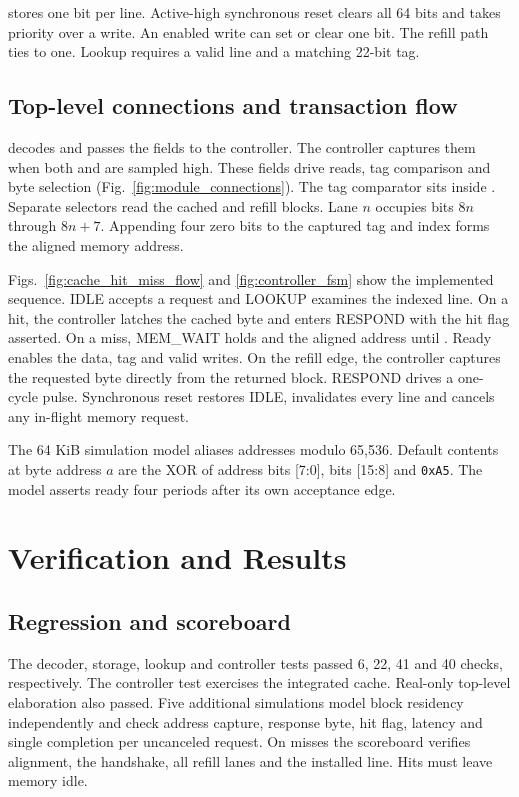 \documentclass[conference]{IEEEtran}
\begin{document}
 stores one bit per line. Active-high synchronous reset clears all 64 bits and takes priority over a write. An enabled write can set or clear one bit. The refill path ties  to one. Lookup requires a valid line and a matching 22-bit tag.

\subsection{Top-level connections and transaction flow}
 decodes  and passes the fields to the controller. The controller captures them when both  and  are sampled high. These fields drive reads, tag comparison and byte selection (Fig.~\ref{fig:module_connections}). The tag comparator sits inside . Separate selectors read the cached and refill blocks. Lane $n$ occupies bits $8n$ through $8n+7$. Appending four zero bits to the captured tag and index forms the aligned memory address.

Figs.~\ref{fig:cache_hit_miss_flow} and \ref{fig:controller_fsm} show the implemented sequence. IDLE accepts a request and LOOKUP examines the indexed line. On a hit, the controller latches the cached byte and enters RESPOND with the hit flag asserted. On a miss, MEM\_WAIT holds  and the aligned address until . Ready enables the data, tag and valid writes. On the refill edge, the controller captures the requested byte directly from the returned block. RESPOND drives a one-cycle  pulse. Synchronous reset restores IDLE, invalidates every line and cancels any in-flight memory request.

The 64 KiB simulation model aliases addresses modulo 65,536. Default contents at byte address $a$ are the XOR of address bits [7:0], bits [15:8] and \texttt{0xA5}. The model asserts ready four periods after its own acceptance edge.

\section{Verification and Results}
\subsection{Regression and scoreboard}
The decoder, storage, lookup and controller tests passed 6, 22, 41 and 40 checks, respectively. The controller test exercises the integrated cache. Real-only top-level elaboration also passed. Five additional simulations model block residency independently and check address capture, response byte, hit flag, latency and single completion per uncanceled request. On misses the scoreboard verifies alignment, the handshake, all refill lanes and the installed line. Hits must leave memory idle.
\end{document}
